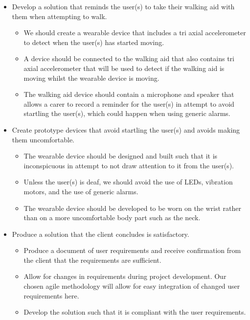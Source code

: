        \begin{itemize} \item Develop a solution that reminds the user(s) to take their walking aid with them when
        attempting to walk.

                    \begin{itemize} \item We should create a wearable device that includes a tri axial accelerometer to
                    detect when the user(s) has started moving. \item A device should be connected to the walking aid
                    that also contains tri axial accelerometer that will be used to detect if the walking aid is moving
                    whilst the wearable device is moving. \item The walking aid device should contain a microphone and
                    speaker that allows a carer to record a reminder for the user(s) in attempt to avoid startling the
                    user(s), which could happen when using generic alarms. \end{itemize}

            \item Create prototype devices that avoid startling the user(s) and avoids making them uncomfortable.

                    \begin{itemize} \item The wearable device should be designed and built such that it is inconspicuous
                    in attempt to not draw attention to it from the user(s). \item Unless the user(s) is deaf, we should
                    avoid the use of LEDs, vibration motors, and the use of generic alarms. \item The wearable device
                    should be developed to be worn on the wrist rather than on a more uncomfortable body part such as
                    the neck. \end{itemize}

            \item Produce a solution that the client concludes is satisfactory.

                    \begin{itemize} \item Produce a document of user requirements and receive confirmation from the
                    client that the requirements are sufficient. \item Allow for changes in requirements during project
                    development. Our chosen agile methodology will allow for easy integration of changed user
                    requirements here. \item Develop the solution such that it is compliant with the user requirements.
                    \end{itemize}

        \end{itemize}
